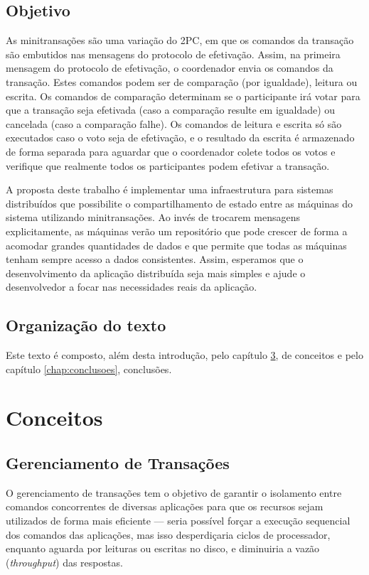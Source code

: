 \documentclass[11pt,twoside,a4paper]{book}
\begin{document}
\section{Objetivo}
\label{sec:objetivo}
As minitransações \cite{Aguilera:07} são uma variação do 2PC, em que os comandos da transação são embutidos nas mensagens do protocolo de efetivação. Assim, na primeira mensagem do protocolo de efetivação, o coordenador envia os comandos da transação. Estes comandos podem ser de comparação (por igualdade), leitura ou escrita. Os comandos de comparação determinam se o participante irá votar para que a transação seja efetivada (caso a comparação resulte em igualdade) ou cancelada (caso a comparação falhe). Os comandos de leitura e escrita só são executados caso o voto seja de efetivação, e o resultado da escrita é armazenado de forma separada para aguardar que o coordenador colete todos os votos e verifique que realmente todos os participantes podem efetivar a transação.

A proposta deste trabalho é implementar uma infraestrutura para sistemas distribuídos que possibilite o compartilhamento de estado entre as máquinas do sistema utilizando minitransações. Ao invés de trocarem mensagens explicitamente, as máquinas verão um repositório que pode crescer de forma a acomodar grandes quantidades de dados e que permite que todas as máquinas tenham sempre acesso a dados consistentes. Assim, esperamos que o desenvolvimento da aplicação distribuída seja mais simples e ajude o desenvolvedor a focar nas necessidades reais da aplicação.

\section{Organização do texto}
\label{sec:organizacao_do_texto}
Este texto é composto, além desta introdução, pelo capítulo \ref{chap:conceitos}, de conceitos e pelo capítulo \ref{chap:conclusoes}, conclusões.

\chapter{Conceitos}
\label{chap:conceitos}

\section{Gerenciamento de Transações}
\label{sec:gerenciamento_de_transacoes}
O gerenciamento de transações tem o objetivo de garantir o isolamento entre comandos concorrentes de diversas aplicações para que os recursos sejam utilizados de forma mais eficiente --- seria possível forçar a execução sequencial dos comandos das aplicações, mas isso desperdiçaria ciclos de processador, enquanto aguarda por leituras ou escritas no disco, e diminuiria a vazão (\emph{throughput}) das respostas.
\end{document}
